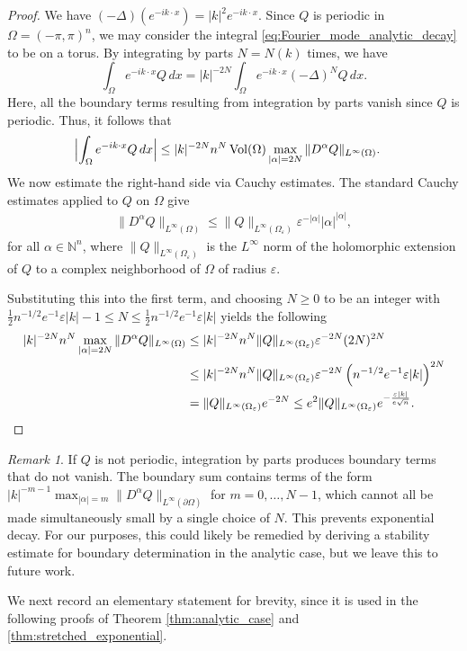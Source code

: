\documentclass[a4paper, 11pt, twoside, notitlepage]{amsart}
\theoremstyle{definition}
\theoremstyle{remark}
\newtheorem{remark}{Remark}[section]
\begin{document}
\begin{proof}
We have $(-\Delta)(e^{-ik\cdot x}) = |k|^{2} e^{-ik\cdot x}$. Since $Q$ is periodic in $\Omega = (-\pi, \pi)^n$, we may consider the integral \eqref{eq:Fourier_mode_analytic_decay} to be on a torus. By integrating by parts $N=N(k)$ times, we have 
\begin{equation*}
\int_\Omega e^{-ik \cdot x} Q \, dx
= |k|^{-2N} \int_\Omega e^{-ik \cdot x} (-\Delta)^N Q \, dx. 
\end{equation*}
Here, all the boundary terms resulting from integration by parts vanish since $Q$ is periodic. Thus, it follows that 
\begin{align*}
    \Bigl|\int_\Omega e^{-ik\cdot x} Q \, dx\Bigr| 
    &\leq |k|^{-2N} n^{N} \operatorname{Vol}(\Omega) 
       \max_{|\alpha|=2N} \|D^\alpha Q\|_{L^\infty(\Omega)}.
\end{align*}
We now estimate the right-hand side via Cauchy estimates. 
The standard Cauchy estimates applied to $Q$ on $\Omega$ give
\begin{align*}
    \|D^\alpha Q\|_{L^\infty(\Omega)}
    \leq \|Q\|_{L^\infty(\Omega_\varepsilon)} 
       \varepsilon^{-|\alpha|} |\alpha|^{|\alpha|},
\end{align*}
for all $\alpha\in \mathbb{N}^n$, where $\|Q\|_{L^\infty(\Omega_\varepsilon)}$ 
is the $L^\infty$ norm of the holomorphic extension of $Q$ to a 
complex neighborhood of $\Omega$ of radius $\varepsilon$.


% 
Substituting this into the first term, and choosing $N \geq 0$ to be an integer with $\frac{1}{2} n^{-1/2}e^{-1}\varepsilon |k| - 1 \leq N \leq \frac{1}{2} n^{-1/2}e^{-1}\varepsilon |k|$ yields the following \begin{align*}
|k|^{-2N}n^{N}\max_{|\alpha|=2N}\|D^\alpha Q\|_{L^\infty(\Omega)} &\leq |k|^{-2N}n^{N}\|Q\|_{L^\infty(\Omega_\varepsilon)} \varepsilon^{-2N}(2N)^{2N} \\
&\leq |k|^{-2N}n^{N}\|Q\|_{L^\infty(\Omega_\varepsilon)}\varepsilon^{-2N}\left(n^{-1/2}e^{-1}\varepsilon|k|\right)^{2N} \\
&= \|Q\|_{L^\infty(\Omega_\varepsilon)} e^{-2 N} \leq e^2 \|Q\|_{L^\infty(\Omega_\varepsilon)} e^{- \frac{\varepsilon|k|}{e \sqrt{n}} }. \qedhere
\end{align*}
\end{proof}

\begin{remark}
If \(Q\) is not periodic, integration by parts produces boundary terms 
that do not vanish. The boundary sum contains terms of the form 
\(|k|^{-m-1} \max_{|\alpha|=m} \|D^\alpha Q\|_{L^\infty(\partial\Omega)}\) 
for \(m = 0, \dots, N-1\), which cannot all be made 
simultaneously small by a single choice of \(N\). This prevents exponential decay. 
For our purposes, this could likely be remedied by deriving a stability 
estimate for boundary determination in the analytic case, but we leave 
this to future work. 
\end{remark}
We next record an elementary statement for brevity, since it is used in the following proofs of Theorem \ref{thm:analytic_case} and \ref{thm:stretched_exponential}.
\end{document}
